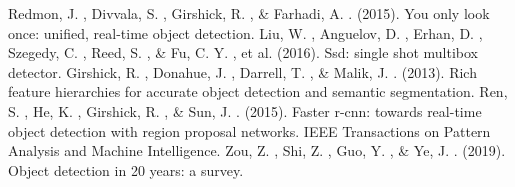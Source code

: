 \documentclass[journal,transmag]{IEEEtran}
\begin{document}


\ifCLASSOPTIONcaptionsoff
  \newpage
\fi





%
%
%
\begin{thebibliography}{1}
Redmon, J. , Divvala, S. , Girshick, R. , \& Farhadi, A. . (2015). You only look once: unified, real-time object detection.
Liu, W. , Anguelov, D. , Erhan, D. , Szegedy, C. , Reed, S. , \& Fu, C. Y. , et al. (2016). Ssd: single shot multibox detector.
Girshick, R. , Donahue, J. , Darrell, T. , \& Malik, J. . (2013). Rich feature hierarchies for accurate object detection and semantic segmentation.
Ren, S. , He, K. , Girshick, R. , \& Sun, J. . (2015). Faster r-cnn: towards real-time object detection with region proposal networks. IEEE Transactions on Pattern Analysis and Machine Intelligence.
Zou, Z. , Shi, Z. , Guo, Y. , \& Ye, J. . (2019). Object detection in 20 years: a survey.
\end{thebibliography}

% 
\end{document}
